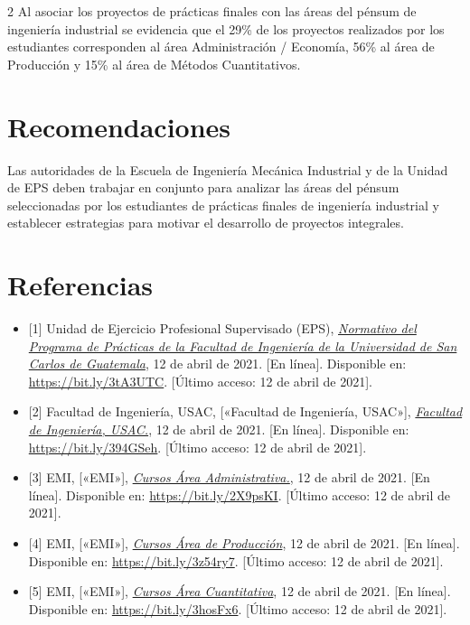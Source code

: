\documentclass[12pt,spanish,Letterpaper,openany]{book}
\begin{document}
\begin {multicols}{2}
Al asociar los proyectos de prácticas finales con las áreas del pénsum de
ingeniería industrial se evidencia que el 29\% de los proyectos realizados por los estudiantes
corresponden al área Administración / Economía, 56\% al área de Producción y 15\% al área de Métodos
Cuantitativos.

\hypertarget{recomendaciones}{%
\section{Recomendaciones}\label{recomendaciones}}

Las autoridades de la Escuela de Ingeniería Mecánica Industrial y de la Unidad de EPS deben trabajar en conjunto para analizar las áreas del pénsum seleccionadas por los estudiantes de prácticas finales de ingeniería industrial y establecer estrategias para motivar el desarrollo de proyectos integrales.

\hypertarget{referencias}{%
\section{Referencias}\label{referencias}}

\begin{itemize}
\item
  {[}1{]} Unidad de Ejercicio Profesional Supervisado (EPS), \href{https://eps.ingenieria.usac.edu.gt/docs/Normativo_finales.pdf/}{\emph{Normativo del Programa de Prácticas de la Facultad de Ingeniería de la Universidad de San Carlos de Guatemala}}, 12 de abril de 2021. {[}En línea{]}. Disponible en: \url{https://bit.ly/3tA3UTC}. {[}Último acceso: 12 de abril de 2021{]}.
\item
  {[}2{]} Facultad de Ingeniería, USAC, {[}«Facultad de Ingeniería, USAC»{]}, \href{https://portal.ingenieria.usac.edu.gt/index.php/destacados-2/1294-redes-de-pensum/}{\emph{Facultad de Ingeniería, USAC.}}, 12 de abril de 2021. {[}En línea{]}. Disponible en: \url{https://bit.ly/394GSeh}. {[}Último acceso: 12 de abril de 2021{]}.
\item
  {[}3{]} EMI, {[}«EMI»{]}, \href{https://emi.ingenieria.usac.edu.gt/courses/area-administrativa/}{\emph{Cursos Área Administrativa.}}, 12 de abril de 2021. {[}En línea{]}. Disponible en: \url{https://bit.ly/2X9psKI}. {[}Último acceso: 12 de abril de 2021{]}.
\item
  {[}4{]} EMI, {[}«EMI»{]}, \href{https://eps.ingenieria.usac.edu.gt/docs/Normativo_finales.pdf/}{\emph{Cursos Área de Producción}}, 12 de abril de 2021. {[}En línea{]}. Disponible en: \url{https://bit.ly/3z54ry7}. {[}Último acceso: 12 de abril de 2021{]}.
\item
  {[}5{]} EMI, {[}«EMI»{]}, \href{https://emi.ingenieria.usac.edu.gt/courses/area-cuantitativa/}{\emph{Cursos Área Cuantitativa}}, 12 de abril de 2021. {[}En línea{]}. Disponible en: \url{https://bit.ly/3hosFx6}. {[}Último acceso: 12 de abril de 2021{]}.
\end{itemize}

\end {multicols}
\end{document}

